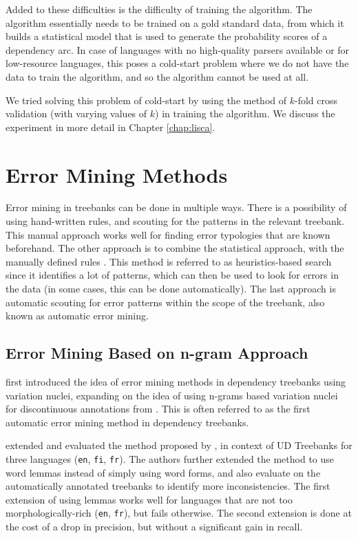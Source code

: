 Added to these difficulties is the difficulty of training the algorithm. The algorithm essentially needs to be trained on a gold standard data, from which it builds a statistical model that is used to generate the probability scores of a dependency arc. In case of languages with no high-quality parsers available or for low-resource languages, this poses a cold-start problem where we do not have the data to train the algorithm, and so the algorithm cannot be used at all.

We tried solving this problem of cold-start by using the method of \(k\)-fold cross validation (with varying values of \(k\)) in training the algorithm. We discuss the experiment in more detail in Chapter \ref{chap:lisca}.

\section{Error Mining Methods}
\label{sec:error-mining}

Error mining in treebanks can be done in multiple ways. There is a possibility of using hand-written rules, and scouting for the patterns in the relevant treebank. This manual approach works well for finding error typologies that are known beforehand. The other approach is to combine the statistical approach, with the manually defined rules \citep{ambati}. This method is referred to as heuristics-based search since it identifies a lot of patterns, which can then be used to look for errors in the data (in some cases, this can be done automatically). The last approach is automatic scouting for error patterns within the scope of the treebank, also known as automatic error mining.

\subsection{Error Mining Based on n-gram Approach}

\cite{boyd} first introduced the idea of error mining methods in dependency treebanks using variation nuclei, expanding on the idea of using n-grams based variation nuclei for discontinuous annotations from \cite{dickinson05}. This is often referred to as the first automatic error mining method in dependency treebanks.

\cite{de2017assessing} extended and evaluated the method proposed by \citeauthor{boyd}, in context of UD Treebanks for three languages (\verb|en|, \verb|fi|, \verb|fr|). The authors further extended the method to use word lemmas instead of simply using word forms, and also evaluate on the automatically annotated treebanks to identify more inconsistencies. The first extension of using lemmas works well for languages that are not too morphologically-rich (\verb|en|, \verb|fr|), but fails otherwise. The second extension is done at the cost of a drop in precision, but without a significant gain in recall.

